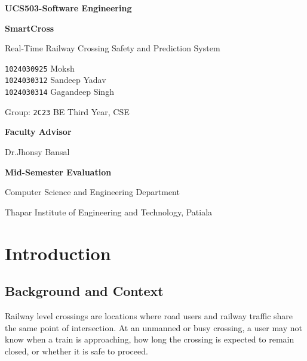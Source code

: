 \documentclass[12pt,a4paper]{report}
\newcommand{\CourseHeader}{UCS503-Software Engineering}
\newcommand{\ProjectName}{SmartCross}
\newcommand{\ProjectSubtitle}{Real-Time Railway Crossing Safety and Prediction System}
\newcommand{\StudentDetails}{%
  \texttt{1024030925} Moksh \\
  \texttt{1024030312} Sandeep Yadav \\
  \texttt{1024030314} Gagandeep Singh \\
  
}
\newcommand{\GroupDetails}{Group: \texttt{2C23} \quad BE Third Year, CSE}
\newcommand{\AdvisorDetails}{Dr.Jhonsy Bansal}
\begin{document}

\begin{titlepage}
\centering
\vspace*{1.5cm}

{\Large\bfseries \CourseHeader\par}
\vspace{2cm}

{\Huge\bfseries \ProjectName\par}
\vspace{0.7cm}

{\Large \ProjectSubtitle\par}
\vspace{2cm}

{\large
\StudentDetails\par}
\vspace{1.2cm}

{\large \GroupDetails\par}
\vspace{1.2cm}

{\large\bfseries Faculty Advisor\par}
{\large \AdvisorDetails\par}

\vfill

{\large\bfseries Mid-Semester Evaluation\par}
\vspace{0.3cm}
{\large Computer Science and Engineering Department\par}
{\large Thapar Institute of Engineering and Technology, Patiala\par}

\end{titlepage}
\tableofcontents


\chapter{Introduction}

\section{Background and Context}

Railway level crossings are locations where road users and railway traffic share the
same point of intersection. At an unmanned or busy crossing, a user may not know
when a train is approaching, how long the crossing is expected to remain closed, or
whether it is safe to proceed.
\end{document}

